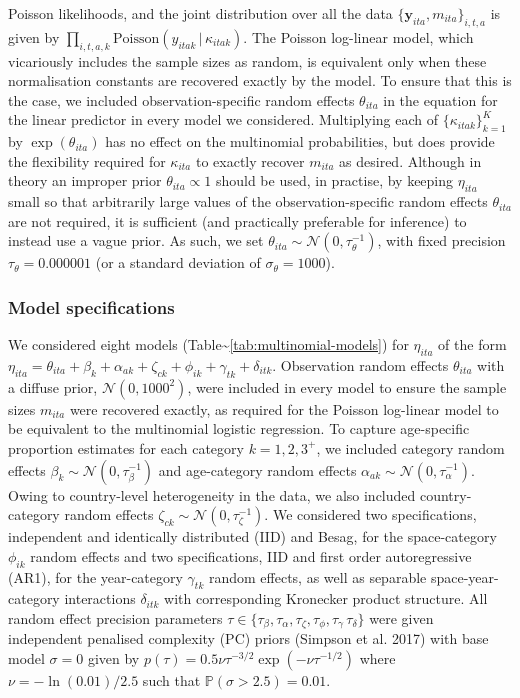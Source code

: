 \documentclass[
]{article}
\begin{document}
Poisson likelihoods, and the joint distribution over all the data
\(\{\mathbf{y}_{ita}, m_{ita}\}_{i, t, a}\) is given by
\(\prod_{i, t, a, k} \text{Poisson} \left( y_{itak} \, | \, \kappa_{itak} \right)\).
The Poisson log-linear model, which vicariously includes the sample
sizes as random, is equivalent only when these normalisation constants
are recovered exactly by the model. To ensure that this is the case, we
included observation-specific random effects \(\theta_{ita}\) in the
equation for the linear predictor in every model we considered.
Multiplying each of \(\{\kappa_{itak}\}_{k = 1}^K\) by
\(\exp(\theta_{ita})\) has no effect on the multinomial probabilities,
but does provide the flexibility required for \(\kappa_{ita}\) to
exactly recover \(m_{ita}\) as desired. Although in theory an improper
prior \(\theta_{ita} \propto 1\) should be used, in practise, by keeping
\(\eta_{ita}\) small so that arbitrarily large values of the
observation-specific random effects \(\theta_{ita}\) are not required,
it is sufficient (and practically preferable for inference) to instead
use a vague prior. As such, we set
\(\theta_{ita} \sim \mathcal{N}(0, \tau_\theta^{-1})\), with fixed
precision \(\tau_\theta = 0.000001\) (or a standard deviation of
\(\sigma_\theta = 1000\)).

\hypertarget{model-specifications}{%
\subsubsection{Model specifications}\label{model-specifications}}

We considered eight models
(Table\textasciitilde{}\ref{tab:multinomial-models}) for \(\eta_{ita}\)
of the form
\(\eta_{ita} = \theta_{ita} + \beta_k + \alpha_{ak} + \zeta_{ck} + \phi_{ik} + \gamma_{tk} + \delta_{itk}\).
Observation random effects \(\theta_{ita}\) with a diffuse prior,
\(\mathcal{N}(0, 1000^2)\), were included in every model to ensure the
sample sizes \(m_{ita}\) were recovered exactly, as required for the
Poisson log-linear model to be equivalent to the multinomial logistic
regression. To capture age-specific proportion estimates for each
category \(k = 1, 2, 3^{+}\), we included category random effects
\(\beta_k \sim \mathcal{N}(0, \tau_\beta^{-1})\) and age-category random
effects \(\alpha_{ak} \sim \mathcal{N}(0, \tau_\alpha^{-1})\). Owing to
country-level heterogeneity in the data, we also included
country-category random effects
\(\zeta_{ck} \sim \mathcal{N}(0, \tau_\zeta^{-1})\). We considered two
specifications, independent and identically distributed (IID) and Besag,
for the space-category \(\phi_{ik}\) random effects and two
specifications, IID and first order autoregressive (AR1), for the
year-category \(\gamma_{tk}\) random effects, as well as separable
space-year-category interactions \(\delta_{itk}\) with corresponding
Kronecker product structure. All random effect precision parameters
\(\tau \in \{\tau_\beta, \tau_\alpha, \tau_\zeta, \tau_\phi, \tau_\gamma\, \tau_\delta\}\)
were given independent penalised complexity (PC) priors (Simpson et al.
2017) with base model \(\sigma = 0\) given by
\(p(\tau) = 0.5 \nu \tau^{-3/2} \exp \left( - \nu \tau^{-1/2} \right)\)
where \(\nu = - \ln(0.01) / 2.5\) such that
\(\mathbb{P}(\sigma > 2.5) = 0.01\).
\end{document}
